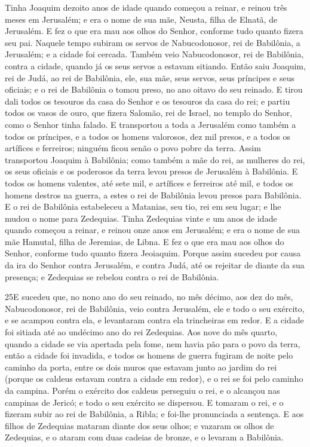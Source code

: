 Tinha Joaquim dezoito anos de idade quando começou a reinar, e
reinou três meses em Jerusalém; e era o nome de sua mãe, Neusta,
filha de Elnatã, de Jerusalém. E fez o que era mau aos olhos do
Senhor, conforme tudo quanto fizera seu pai. Naquele tempo
subiram os servos de Nabucodonosor, rei de Babilônia, a Jerusalém; e
a cidade foi cercada. Também veio Nabucodonosor, rei de
Babilônia, contra a cidade, quando já os seus servos a estavam
sitiando. Então saiu Joaquim, rei de Judá, ao rei de
Babilônia, ele, sua mãe, seus servos, seus príncipes e seus
oficiais; e o rei de Babilônia o tomou preso, no ano oitavo do seu
reinado. E tirou dali todos os tesouros da casa do Senhor e
os tesouros da casa do rei; e partiu todos os vasos de ouro, que
fizera Salomão, rei de Israel, no templo do Senhor, como o Senhor
tinha falado. E transportou a toda a Jerusalém como também a
todos os príncipes, e a todos os homens valorosos, dez mil presos, e
a todos os artífices e ferreiros; ninguém ficou senão o povo pobre
da terra. Assim transportou Joaquim à Babilônia; como também
a mãe do rei, as mulheres do rei, os seus oficiais e os poderosos da
terra levou presos de Jerusalém à Babilônia. E todos os
homens valentes, até sete mil, e artífices e ferreiros até mil, e
todos os homens destros na guerra, a estes o rei de Babilônia levou
presos para Babilônia. E o rei de Babilônia estabeleceu a
Matanias, seu tio, rei em seu lugar; e lhe mudou o nome para
Zedequias. Tinha Zedequias vinte e um anos de idade quando
começou a reinar, e reinou onze anos em Jerusalém; e era o nome de
sua mãe Hamutal, filha de Jeremias, de Libna. E fez o que era
mau aos olhos do Senhor, conforme tudo quanto fizera Jeoiaquim.
Porque assim sucedeu por causa da ira do Senhor contra
Jerusalém, e contra Judá, até os rejeitar de diante da sua presença;
e Zedequias se rebelou contra o rei de Babilônia.

\medskip

\lettrine{25} E sucedeu que, no nono ano do seu reinado, no
mês décimo, aos dez do mês, Nabucodonosor, rei de Babilônia, veio
contra Jerusalém, ele e todo o seu exército, e se acampou contra
ela, e levantaram contra ela trincheiras em redor. E a cidade
foi sitiada até ao undécimo ano do rei Zedequias. Aos nove do
mês quarto, quando a cidade se via apertada pela fome, nem havia pão
para o povo da terra, então a cidade foi invadida, e todos os
homens de guerra fugiram de noite pelo caminho da porta, entre os
dois muros que estavam junto ao jardim do rei (porque os caldeus
estavam contra a cidade em redor), e o rei se foi pelo caminho da
campina. Porém o exército dos caldeus perseguiu o rei, e o
alcançou nas campinas de Jericó; e todo o seu exército se dispersou.
E tomaram o rei, e o fizeram subir ao rei de Babilônia, a Ribla;
e foi-lhe pronunciada a sentença. E aos filhos de Zedequias
mataram diante dos seus olhos; e vazaram os olhos de Zedequias, e o
ataram com duas cadeias de bronze, e o levaram a Babilônia.

